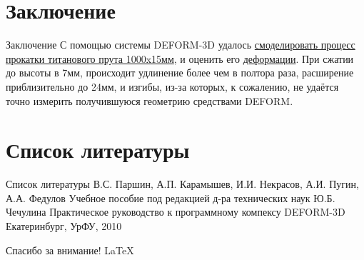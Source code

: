 \documentclass{beamer}
\begin{document}
\section{Заключение}
\begin{frame}{Заключение}
С помощью системы DEFORM-3D удалось \hyperlink{1.3}{смоделировать процесс прокатки титанового прута 1000x15мм}, и оценить его \hyperlink{1.4}{деформации}.
При сжатии до высоты в 7мм, происходит удлинение более чем в полтора раза, расширение приблизительно до 24мм, и изгибы, из-за которых, к сожалению, не удаётся точно измерить получившуюся геометрию средствами DEFORM.
\end{frame}

\section{Список литературы}
\begin{frame}{Список литературы}
В.С. Паршин, А.П. Карамышев, И.И. Некрасов, А.И. Пугин, А.А. Федулов
Учебное пособие под редакцией д-ра технических наук Ю.Б. Чечулина
Практическое руководство к программному компексу DEFORM-3D
Екатеринбург, УрФУ, 2010
\end{frame}

\begin{frame}{Спасибо за внимание!}
\vfill
\centering\LaTeX
\end{frame}
\end{document}
